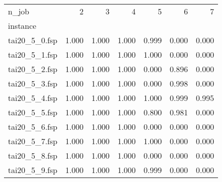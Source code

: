 \begin{tabular}{lrrrrrr}
\toprule
n_job & 2 & 3 & 4 & 5 & 6 & 7 \\
instance &  &  &  &  &  &  \\
\midrule
tai20_5_0.fsp & 1.000 & 1.000 & 1.000 & 0.999 & 0.000 & 0.000 \\
tai20_5_1.fsp & 1.000 & 1.000 & 1.000 & 1.000 & 0.000 & 0.000 \\
tai20_5_2.fsp & 1.000 & 1.000 & 1.000 & 0.000 & 0.896 & 0.000 \\
tai20_5_3.fsp & 1.000 & 1.000 & 1.000 & 0.000 & 0.998 & 0.000 \\
tai20_5_4.fsp & 1.000 & 1.000 & 1.000 & 1.000 & 0.999 & 0.995 \\
tai20_5_5.fsp & 1.000 & 1.000 & 1.000 & 0.800 & 0.981 & 0.000 \\
tai20_5_6.fsp & 1.000 & 1.000 & 1.000 & 0.000 & 0.000 & 0.000 \\
tai20_5_7.fsp & 1.000 & 1.000 & 1.000 & 1.000 & 0.000 & 0.000 \\
tai20_5_8.fsp & 1.000 & 1.000 & 1.000 & 0.000 & 0.000 & 0.000 \\
tai20_5_9.fsp & 1.000 & 1.000 & 1.000 & 0.999 & 0.000 & 0.000 \\
\bottomrule
\end{tabular}

